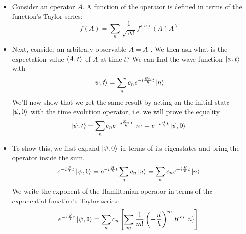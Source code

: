 \documentclass[11pt, a4paper]{article}
\begin{document}
\begin{itemize}
	\item Consider an operator $ A $. A function of the operator is defined in terms of the function's Taylor series:
	\begin{equation*}
		f(A) = \sum_{n} \frac{1}{\sqrt{N!}}f^{(n)}(A)A^{N}
	\end{equation*}

	\item Next, consider an arbitrary observable $ A = A^{\dagger} $. We then ask what is the expectation value $ \ev{A, t} $ of $ A $ at time $ t $? We can find the wave function $ \ket{\psi, t} $ with
	\begin{equation*}
		\ket{\psi, t} = \sum_{n} c_{n}e^{-i \frac{E_{n}}{\hbar}t}\ket{n}
	\end{equation*}
	We'll now show that we get the same result by acting on the initial state $ \ket{\psi, 0} $ with the time evolution operator, i.e. we will prove the equality
	\begin{equation*}
		\ket{\psi, t} \equiv \sum_{n} c_{n}e^{-i \frac{E_{n}}{\hbar}t}\ket{n} = e^{-i\frac{H}{\hbar}t}\ket{\psi, 0}
	\end{equation*}
	
	\item To show this, we first expand $ \ket{\psi, 0} $ in terms of its eigenstates and bring the operator inside the sum.
	\begin{equation*}
		 e^{-i\frac{H}{\hbar}t}\ket{\psi, 0} =  e^{-i\frac{H}{\hbar}t}\sum_{n}c_{n}\ket{n} = \sum_{n}c_{n}e^{-i\frac{H}{\hbar}t}\ket{n}
	\end{equation*}
	We write the exponent of the Hamiltonian operator in terms of the exponential function's Taylor series:
	\begin{equation*}
		e^{-i\frac{H}{\hbar}t}\ket{\psi, 0}  = \sum_{n}c_{n} \left[\sum_{m}\frac{1}{m!}\left (-\frac{it}{\hbar}\right )^{m}H^{m}\ket{n}\right]
	\end{equation*}
	

\end{itemize}
\end{document}
